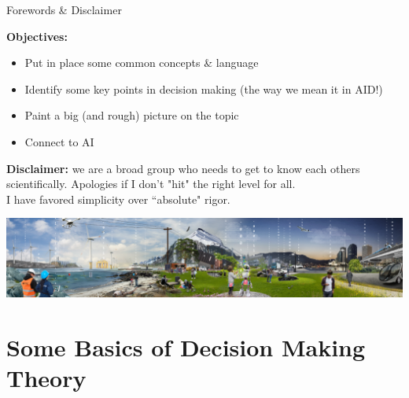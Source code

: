 \documentclass[lecture]{beamer}
\begin{document}
\begin{frame}{\normalsize Forewords \& Disclaimer}
\footnotesize

\textbf{Objectives:}
\begin{itemize}
\item Put in place some common concepts \& language
\item Identify some key points in decision making (the way we mean it in AID!)
\item Paint a big (and rough) picture on the topic
\item Connect to AI
\end{itemize}
\center
\textbf{Disclaimer:} we are a broad group who needs to get to know each others scientifically. Apologies if I don't "hit" the right level for all. \\I have favored simplicity over ``absolute" rigor. 

\vspace{1cm}
\includegraphics[width=1\textwidth,clip]{Figures/SmartGridLab.eps}

\end{frame}

\section{Some Basics of Decision Making Theory}
\end{document}
